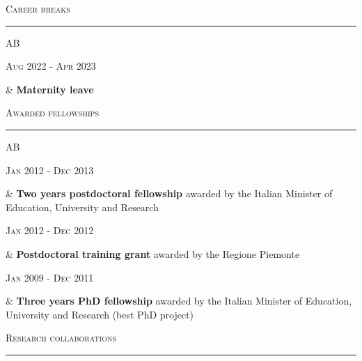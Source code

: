 \documentclass[a4paper,10pt]{article}
\newcommand{\mediumtitle}[1]{
	\vspace{0.2cm}
	{\noindent
	\Large \textsc{#1}\\[-2ex]
	\hrule
	\vspace{0.2cm}}
}
\newenvironment{doubletablelist}
{
	\vspace{-0.2cm}
	\begin{longtable}[!h]{AB}}{\end{longtable}
}
\newcommand{\dtlist}[2]{
\hspace{-3cm}
\noindent
	\begin{minipage}{0.22\textwidth}
	\begin{flushright}
	\textsc{#1}
	\end{flushright}
	\end{minipage}
	& #2\\[0.2cm]
}
\begin{document}
\mediumtitle{Career breaks}
\begin{doubletablelist}
    \dtlist{Aug 2022 - Apr 2023}{\textbf{Maternity leave}
	}
\end{doubletablelist}

\mediumtitle{Awarded fellowships}

\begin{doubletablelist}
    \dtlist{Jan 2012 - Dec 2013}{\textbf{Two years postdoctoral fellowship} awarded by the Italian Minister of Education, University and Research} 
	\dtlist{Jan 2012 - Dec 2012}{\textbf{Postdoctoral training grant} awarded by the Regione Piemonte} 
	\dtlist{Jan 2009 - Dec 2011}{\textbf{Three years PhD fellowship} awarded by the Italian Minister of Education, University and Research (best PhD project)}
\end{doubletablelist}




\mediumtitle{Research collaborations}
\end{document}
